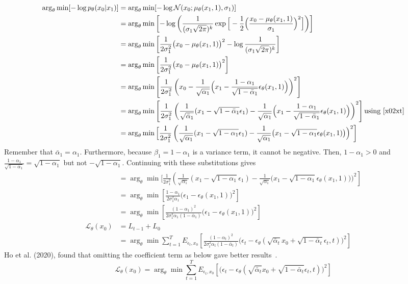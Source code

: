 \documentclass{book}
\numberwithin{equation}{subsection}
\begin{document}
\begin{align}
    \arg_\theta\min[-\log p_\theta(x_0 |x_1)] 
    &= \arg_\theta\min[-\log \mathcal{N}(x_0; \mu_\theta(x_1, 1), \sigma_1)]\\
    &= \arg_\theta\min\left[-\log \left(\frac {1}{(\sigma_1\sqrt{2\pi})^k} \exp\Big[-{\frac {1}{2}}\Big(\frac {x_0-\mu_\theta(x_1, 1)}{\sigma_1}\Big)^2\Big]\right)\right]\\
    &= \arg_\theta\min\left[{\frac {1}{2\sigma_1^2}}\big(x_0-\mu_\theta(x_1, 1)\big)^2-\log \frac {1}{(\sigma_1\sqrt{2\pi})^k}\right]\\
    &= \arg_\theta\min\left[{\frac {1}{2\sigma_1^2}}\big(x_0-\mu_\theta(x_1, 1)\big)^2\right]\\
    &= \arg_\theta\min\left[{\frac {1}{2\sigma_1^2}}\left(x_0-\frac{1}{\sqrt{\alpha_1}} \Big(x_1 - \frac{1 - \alpha_1}{\sqrt{1 - \bar{\alpha}_1}} \epsilon_\theta(x_1,1) \Big)\right)^2\right]\\
    &= \arg_\theta\min\left[{\frac {1}{2\sigma_1^2}}\left(\frac{1}{\sqrt{\bar{\alpha}_1}}(x_1 - \sqrt{1 - \bar{\alpha}_1}\epsilon_1)-\frac{1}{\sqrt{\alpha_1}} \Big(x_1 - \frac{1 - \alpha_1}{\sqrt{1 - \bar{\alpha}_1}} \epsilon_\theta(x_1,1) \Big)\right)^2\right]\text{using~\ref{x02xt}}\\
    &= \arg_\theta\min\Big[{\frac {1}{2\sigma_1^2}}\left(\frac{1}{\sqrt{\alpha_1}}(x_1 - \sqrt{1 - \alpha_1}\epsilon_1)-\frac{1}{\sqrt{\alpha_1}} \big(x_1 - \sqrt{1 - \alpha_1} \epsilon_\theta(x_1,1) \big)\Big)^2\right]
\end{align}
Remember that $\bar{\alpha}_1 = \alpha_1$. Furthermore, because $\beta_1 = 1-\alpha_1$ is a variance term, it cannot be negative. Then, $1-\alpha_1 > 0$ and $\frac{1-\alpha_1}{\sqrt{1-\alpha_1}} = \sqrt{1-\alpha_1}$ but not $-\sqrt{1-\alpha_1}$. Continuing with these substitutions gives
\begin{align}
    &= \arg_\theta\min\Big[{\frac {1}{2\sigma_1^2}}\left(\frac{1}{\sqrt{\alpha_1}}(x_1 - \sqrt{1 - \alpha_1}\epsilon_1)-\frac{1}{\sqrt{\alpha_1}} \big(x_1 - \sqrt{1 - \alpha_1} \epsilon_\theta(x_1,1) \big)\Big)^2\right]\\
    &= \arg_\theta\min\left[\frac{1-\alpha_1}{2\sigma_1^2\alpha_1}\big(\epsilon_1-\epsilon_\theta(x_1,1) \big)^2\right]\\
    &= \arg_\theta\min\left[\frac{(1-\alpha_1)^2}{2\sigma_1^2\alpha_1(1 - \bar{\alpha}_1)}\big(\epsilon_1-\epsilon_\theta(x_1,1) \big)^2\right]\\
    \mathcal{L}_\theta(x_0) &= L_{t-1}+L_0\\
    &= \arg_\theta\min \sum_{t=1}^TE_{\epsilon_t, x_0}\left[\frac{(1-\alpha_t)^2}{2\sigma_t^2\alpha_t(1 - \bar{\alpha}_t)}\Big(\epsilon_t-\epsilon_\theta(\sqrt{\bar{\alpha}_t}x_0 + \sqrt{1 - \bar{\alpha}_t}\epsilon_t,t) \Big)^2\right]
\end{align}
Ho et al. (2020), found that omitting the coefficient term as below gave better results~\cite{ho_denoising_2020}.
\begin{equation}
    \mathcal{L}_\theta(x_0) = \arg_\theta\min \sum_{t=1}^TE_{\epsilon_t, x_0}\left[\Big(\epsilon_t-\epsilon_\theta(\sqrt{\bar{\alpha}_t}x_0 + \sqrt{1 - \bar{\alpha}_t}\epsilon_t,t) \Big)^2\right]
\end{equation}


\end{document}
